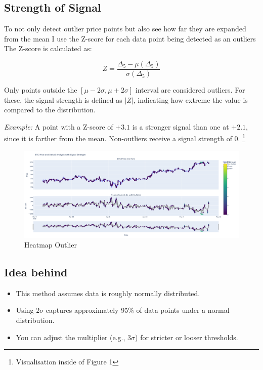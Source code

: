 \documentclass[12pt]{article}
\begin{document}
\subsection*{Strength of Signal}

To not only detect outlier price points but also see how far they are expanded from the mean I use the Z-score for each data point being detected as an outliers
\newpage
The Z-score is calculated as:


$$Z = \frac{\Delta_5 - \mu(\Delta_5)}{\sigma(\Delta_5)}$$


Only points outside the $[\mu - 2\sigma, \mu + 2\sigma]$ interval are considered outliers.  
For these, the signal strength is defined as $|Z|$, indicating how extreme the value is compared to the distribution.

\textit{Example:}  
A point with a Z-score of $+3.1$ is a stronger signal than one at $+2.1$, since it is farther from the mean.  
Non-outliers receive a signal strength of 0. 
\footnote{Visualisation inside of Figure 1}





\begin{figure}
    \centering
    \includegraphics[width=1\textwidth]{imgs/outlier_signal_visualised.png}
    \caption{Heatmap Outlier}
\end{figure}




\newpage


\subsection*{Idea behind}

\begin{itemize}
    \item This method assumes data is roughly normally distributed.
    \item Using $2\sigma$ captures approximately 95\% of data points under a normal distribution.
    \item You can adjust the multiplier (e.g., $3\sigma$) for stricter or looser thresholds.
\end{itemize}
\end{document}
